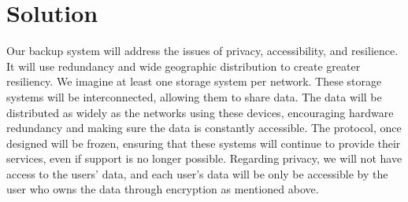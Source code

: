\section{Solution}
Our backup system will address the issues of privacy, accessibility, and resilience. It will use redundancy and wide geographic distribution to create greater resiliency. We imagine at least one storage system per network. These storage systems will be interconnected, allowing them to share data. The data will be distributed as widely as the networks using these devices, encouraging hardware redundancy and making sure the data is constantly accessible. The protocol, once designed will be frozen, ensuring that these systems will continue to provide their services, even if support is no longer possible. Regarding privacy, we will not have access to the users' data, and each user's data will be only be accessible by the user who owns the data through encryption as mentioned above.
